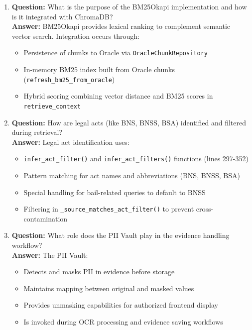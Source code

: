 \documentclass[11pt]{article}
\begin{document}
\begin{enumerate}
\item \textbf{Question:} What is the purpose of the BM25Okapi implementation and how is it integrated with ChromaDB?
\\ \textbf{Answer:} BM25Okapi provides lexical ranking to complement semantic vector search. Integration occurs through:
\begin{itemize}
\item Persistence of chunks to Oracle via \texttt{OracleChunkRepository}
\item In-memory BM25 index built from Oracle chunks (\texttt{refresh\_bm25\_from\_oracle})
\item Hybrid scoring combining vector distance and BM25 scores in \texttt{retrieve\_context}
\end{itemize}

\item \textbf{Question:} How are legal acts (like BNS, BNSS, BSA) identified and filtered during retrieval?
\\ \textbf{Answer:} Legal act identification uses:
\begin{itemize}
\item \texttt{infer\_act\_filter()} and \texttt{infer\_act\_filters()} functions (lines 297-352)
\item Pattern matching for act names and abbreviations (BNS, BNSS, BSA)
\item Special handling for bail-related queries to default to BNSS
\item Filtering in \texttt{\_source\_matches\_act\_filter()} to prevent cross-contamination
\end{itemize}

\item \textbf{Question:} What role does the PII Vault play in the evidence handling workflow?
\\ \textbf{Answer:} The PII Vault:
\begin{itemize}
\item Detects and masks PII in evidence before storage
\item Maintains mapping between original and masked values
\item Provides unmasking capabilities for authorized frontend display
\item Is invoked during OCR processing and evidence saving workflows
\end{itemize}


\end{enumerate}
\end{document}

